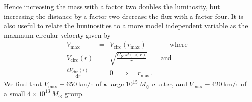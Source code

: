 \documentclass[10pt,aps,pra,reprint,amsmath,amsfonts,amssymb,showpacs]{revtex4-1}
\def\del#1{{}}
\newcommand{\rmn}{\mathrm}
\newcommand{\sub}{\rmn{sub}}
\newcommand{\msun}{M_\odot}
\newcommand{\dd}{\rmn{d}}
\begin{document}
Hence increasing the mass with a factor two doubles the luminosity,
but increasing the distance by a factor two decrease the flux with a
factor four. It is also useful to relate the luminosities to a more
model independent variable as the maximum circular velocity given by
\begin{eqnarray}
V_\rmn{max} &=& V_\rmn{circ}(r_\rmn{max})\qquad\,\,\,\,\,\,\,\,\,\rmn{where}\nonumber\\
V_\rmn{circ}(r)&=& \sqrt{\frac{G_\rmn{N}\,M(<r)}{r}}\qquad\rmn{and}\nonumber\\
\frac{\dd V_\rmn{circ}(r)}{\dd r} &=& 0\quad \Longrightarrow\quad r_\rmn{max}\,.
\end{eqnarray}
We find that $V_\rmn{max}=650\,\rmn{km/s}$ of a large $10^{15}\,\msun$
cluster, and $V_\rmn{max}=420\,\rmn{km/s}$ of a small
$4\times10^{13}\,\msun$ group.


\del{
\begin{eqnarray}
L_{\gamma,\rmn{sub tot}} \propto N\,L_{\gamma,\sub} \propto N\,M_\sub 
 \propto M_\sub^{\left(A+1\right)}\,\frac{\dd N_\sub}{\dd M} \propto  M^{A-0.9}
\end{eqnarray}
Assuming that the concentration $c$ decrease for increasing mass as it
does for the mass range $10^{12}-10^{14}\,\msun$ where
$L_{\gamma,\sub} \propto N\,M_\sub^A$, where $A<1$.
}
\end{document}
